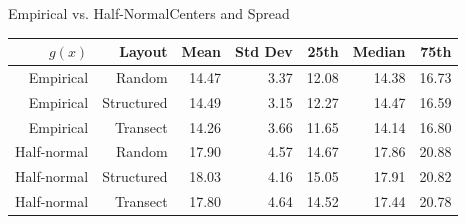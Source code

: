 \documentclass{beamer}
\begin{document}
\begin{frame}{Empirical vs. Half-Normal}{Centers and Spread}
\begin{table}
	\begin{tabular}{ r r |r r| r r r}
		$g(x)$      & Layout     & Mean  & Std Dev & 25th  & Median & 75th  \\ \hline\hline
		Empirical   & Random     & 14.47 & 3.37    & 12.08 & 14.38  & 16.73 \\
		Empirical   & Structured & 14.49 & 3.15    & 12.27 & 14.47  & 16.59 \\
		Empirical   & Transect   & 14.26 & 3.66    & 11.65 & 14.14  & 16.80 \\ \hline
		Half-normal & Random     & 17.90 & 4.57    & 14.67 & 17.86  & 20.88 \\
		Half-normal & Structured & 18.03 & 4.16    & 15.05 & 17.91  & 20.82 \\
		Half-normal & Transect   & 17.80 & 4.64    & 14.52 & 17.44  & 20.78
	\end{tabular}
\end{table}


\end{frame}
\end{document}

